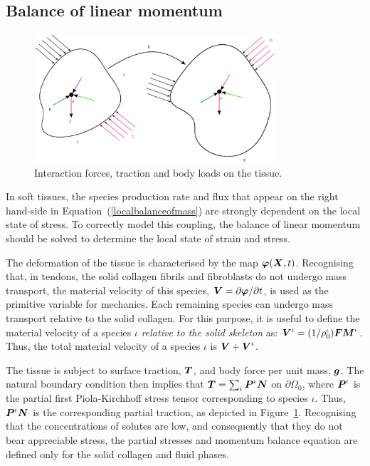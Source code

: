 \subsection{Balance of linear momentum}
\label{balance-of-linear-momentum}

\begin{figure}[ht]
  \centering
  \includegraphics[width=0.8\textwidth]
                  {images/elucidation/continuum-potato-momentum}
  \caption{Interaction forces, traction and body loads on the tissue.}
  \label{continuum-potato-momentum}
\end{figure}

In soft tissues, the species production rate and flux that appear on
the right hand-side in Equation~(\ref{localbalanceofmass}) are
strongly dependent on the local state of stress. To correctly model this
coupling, the balance of linear momentum should be solved to determine
the local state of strain and stress.

The deformation of the tissue is characterised by the map
$\mbox{\boldmath$\varphi$}(\mbox{\boldmath$ X$},t)$. Recognising that, in tendons, the solid collagen
fibrils and fibroblasts do not undergo mass transport, the material
velocity of this species, $\mbox{\boldmath$ V$} = \partial\mbox{\boldmath$\varphi$}/\partial t$, is used
as the primitive variable for mechanics. Each remaining species can
undergo mass transport relative to the solid collagen. For this
purpose, it is useful to define the material velocity of a species
$\iota$ \emph{relative to the solid skeleton} as: $\mbox{\boldmath$ V$}^\iota =
(1/\rho_0^\iota)\mbox{\boldmath$ F$}\mbox{\boldmath$ M$}^\iota$. Thus, the total material velocity of a
species $\iota$ is $\mbox{\boldmath$ V$}+\mbox{\boldmath$ V$}^\iota$.

The tissue is subject to surface traction, $\mbox{\boldmath$ T$}$, and body force per
unit mass, $\mbox{\boldmath$ g$}$. The natural boundary condition then implies that
$\mbox{\boldmath$ T$} = \sum_{\iota}\mbox{\boldmath$ P$}^\iota\mbox{\boldmath$ N$}$ on $\partial\Omega_0$, where
$\mbox{\boldmath$ P$}^\iota$ is the partial first Piola-Kirchhoff stress tensor
corresponding to species $\iota$. Thus, $\mbox{\boldmath$ P$}^\iota\mbox{\boldmath$ N$}$ is the
corresponding partial traction, as depicted in
Figure~\ref{continuum-potato-momentum}. Recognising that the
concentrations of solutes are low, and consequently that they do not
bear appreciable stress, the partial stresses and momentum balance
equation are defined only for the solid collagen and fluid phases.

